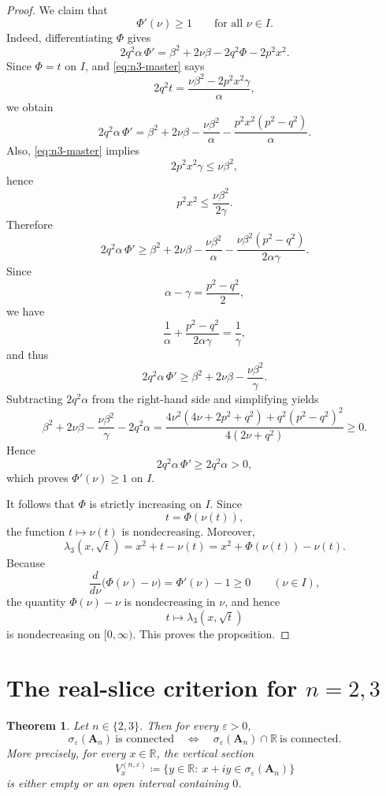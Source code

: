 \documentclass[11pt]{article}
\newtheorem{theorem}{Theorem}[section]
\newcommand{\R}{\mathbb{R}}
\newcommand{\eps}{\varepsilon}
\begin{document}
\begin{proof}
We claim that
\[
\Phi'(\nu)\ge 1
\qquad\text{for all } \nu\in I.
\]
Indeed, differentiating \(\Phi\) gives
\[
2q^2\alpha\,\Phi'
=
\beta^2+2\nu\beta-2q^2\Phi-2p^2x^2.
\]
Since \(\Phi=t\) on \(I\), and \eqref{eq:n3-master} says
\[
2q^2t=\frac{\nu\beta^2-2p^2x^2\gamma}{\alpha},
\]
we obtain
\[
2q^2\alpha\,\Phi'
=
\beta^2+2\nu\beta-\frac{\nu\beta^2}{\alpha}
-\frac{p^2x^2(p^2-q^2)}{\alpha}.
\]
Also, \eqref{eq:n3-master} implies
\[
2p^2x^2\gamma\le \nu\beta^2,
\]
hence
\[
p^2x^2\le \frac{\nu\beta^2}{2\gamma}.
\]
Therefore
\[
2q^2\alpha\,\Phi'
\ge
\beta^2+2\nu\beta-\frac{\nu\beta^2}{\alpha}
-\frac{\nu\beta^2(p^2-q^2)}{2\alpha\gamma}.
\]
Since
\[
\alpha-\gamma=\frac{p^2-q^2}{2},
\]
we have
\[
\frac{1}{\alpha}+\frac{p^2-q^2}{2\alpha\gamma}=\frac{1}{\gamma},
\]
and thus
\[
2q^2\alpha\,\Phi'
\ge
\beta^2+2\nu\beta-\frac{\nu\beta^2}{\gamma}.
\]
Subtracting \(2q^2\alpha\) from the right-hand side and simplifying yields
\[
\beta^2+2\nu\beta-\frac{\nu\beta^2}{\gamma}-2q^2\alpha
=
\frac{4\nu^2(4\nu+2p^2+q^2)+q^2(p^2-q^2)^2}{4(2\nu+q^2)}
\ge 0.
\]
Hence
\[
2q^2\alpha\,\Phi'\ge 2q^2\alpha>0,
\]
which proves \(\Phi'(\nu)\ge 1\) on \(I\).

It follows that \(\Phi\) is strictly increasing on \(I\). Since
\[
t=\Phi(\nu(t)),
\]
the function \(t\mapsto \nu(t)\) is nondecreasing. Moreover,
\[
\lambda_3(x,\sqrt t)=x^2+t-\nu(t)=x^2+\Phi(\nu(t))-\nu(t).
\]
Because
\[
\frac{d}{d\nu}\bigl(\Phi(\nu)-\nu\bigr)=\Phi'(\nu)-1\ge 0
\qquad (\nu\in I),
\]
the quantity \(\Phi(\nu)-\nu\) is nondecreasing in \(\nu\), and hence
\[
t\longmapsto \lambda_3(x,\sqrt t)
\]
is nondecreasing on \([0,\infty)\). This proves the proposition.
\end{proof}

\section{The real-slice criterion for \(n=2,3\)}

\begin{theorem}\label{thm:main}
Let \(n\in\{2,3\}\). Then for every \(\eps>0\),
\[
\sigma_\eps(\mathbf A_n)\ \text{is connected}
\quad\Longleftrightarrow\quad
\sigma_\eps(\mathbf A_n)\cap\R\ \text{is connected}.
\]
More precisely, for every \(x\in\R\), the vertical section
\[
V_x^{(n,\eps)}\coloneqq \{y\in\R:\ x+iy\in\sigma_\eps(\mathbf A_n)\}
\]
is either empty or an open interval containing \(0\).
\end{theorem}
\end{document}
